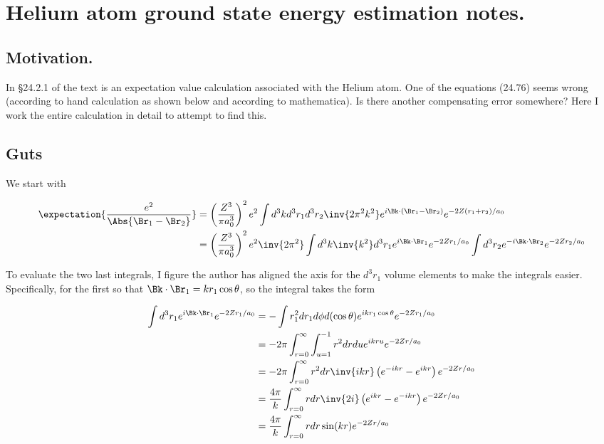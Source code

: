 
%

\chapter{Helium atom ground state energy estimation notes.}
\label{chap:variationalHelium}
{}
\date{Sept 29, 2011}

\beginArtNoToc

\section{Motivation.}

In \S 24.2.1 of the text \cite{desai2009quantum} is an expectation value calculation associated with the Helium atom.  One of the equations (24.76) seems wrong (according to hand calculation as shown below and according to mathematica).  Is there another compensating error somewhere?  Here I work the entire calculation in detail to attempt to find this.

\section{Guts}

We start with

\begin{align*}
\expectation{\frac{e^2}{\Abs{\Br_1 - \Br_2}}}
&=
\left( \frac{Z^3}{\pi a_0^3}\right)^2 e^2
\int d^3 k d^3 r_1 d^3 r_2 \inv{2 \pi^2 k^2} e^{i \Bk \cdot (\Br_1 - \Br_2) } e^{ -2 Z (r_1 + r_2)/a_0} \\
&= 
\left( \frac{Z^3}{\pi a_0^3}\right)^2 e^2
\inv{2 \pi^2} 
\int d^3 k \inv{k^2}
d^3 r_1 
e^{i \Bk \cdot \Br_1 } e^{ -2 Z r_1 /a_0} 
\int 
d^3 r_2 
e^{-i \Bk \cdot \Br_2 } e^{ -2 Z r_2/a_0} \\
\end{align*}

To evaluate the two last integrals, I figure the author has aligned the axis for the $d^3 r_1$ volume elements to make the integrals easier.  Specifically, for the first so that $\Bk \cdot \Br_1 = k r_1 \cos\theta$, so the integral takes the form

\begin{align*}
\int 
d^3 r_1 
e^{i \Bk \cdot \Br_1 } e^{ -2 Z r_1 /a_0} 
&=
-\int 
r_1^2 d r_1 d\phi d(\cos\theta)
e^{i k r_1 \cos\theta } e^{ -2 Z r_1 /a_0} \\
&=
- 2 \pi \int_{r=0}^\infty \int_{u=1}^{-1}
r^2 dr du
e^{i k r u } e^{ -2 Z r /a_0} \\
&=
- 2 \pi \int_{r=0}^\infty 
r^2 dr 
\inv{i k r} \left( e^{-i k r } - e^{i k r} \right) e^{ -2 Z r /a_0} \\
&=
\frac{4 \pi}{k } \int_{r=0}^\infty 
r dr 
\inv{2i} \left( e^{i k r } - e^{-i k r} \right) e^{ -2 Z r /a_0} \\
&=
\frac{4 \pi}{k } \int_{r=0}^\infty r dr \sin(k r) e^{ -2 Z r /a_0} \\
\end{align*}


